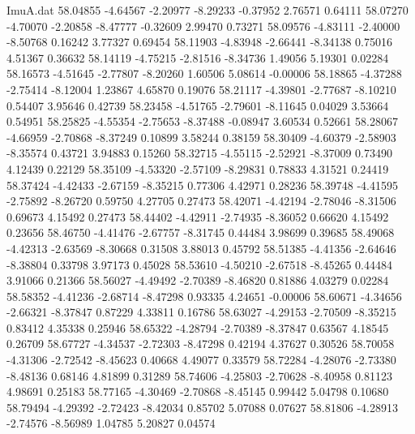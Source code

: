 \begin{filecontents}{ImuA.dat}
  58.04855   -4.64567   -2.20977   -8.29233   -0.37952    2.76571    0.64111
  58.07270   -4.70070   -2.20858   -8.47777   -0.32609    2.99470    0.73271
  58.09576   -4.83111   -2.40000   -8.50768    0.16242    3.77327    0.69454
  58.11903   -4.83948   -2.66441   -8.34138    0.75016    4.51367    0.36632
  58.14119   -4.75215   -2.81516   -8.34736    1.49056    5.19301    0.02284
  58.16573   -4.51645   -2.77807   -8.20260    1.60506    5.08614   -0.00006
  58.18865   -4.37288   -2.75414   -8.12004    1.23867    4.65870    0.19076
  58.21117   -4.39801   -2.77687   -8.10210    0.54407    3.95646    0.42739
  58.23458   -4.51765   -2.79601   -8.11645    0.04029    3.53664    0.54951
  58.25825   -4.55354   -2.75653   -8.37488   -0.08947    3.60534    0.52661
  58.28067   -4.66959   -2.70868   -8.37249    0.10899    3.58244    0.38159
  58.30409   -4.60379   -2.58903   -8.35574    0.43721    3.94883    0.15260
  58.32715   -4.55115   -2.52921   -8.37009    0.73490    4.12439    0.22129
  58.35109   -4.53320   -2.57109   -8.29831    0.78833    4.31521    0.24419
  58.37424   -4.42433   -2.67159   -8.35215    0.77306    4.42971    0.28236
  58.39748   -4.41595   -2.75892   -8.26720    0.59750    4.27705    0.27473
  58.42071   -4.42194   -2.78046   -8.31506    0.69673    4.15492    0.27473
  58.44402   -4.42911   -2.74935   -8.36052    0.66620    4.15492    0.23656
  58.46750   -4.41476   -2.67757   -8.31745    0.44484    3.98699    0.39685
  58.49068   -4.42313   -2.63569   -8.30668    0.31508    3.88013    0.45792
  58.51385   -4.41356   -2.64646   -8.38804    0.33798    3.97173    0.45028
  58.53610   -4.50210   -2.67518   -8.45265    0.44484    3.91066    0.21366
  58.56027   -4.49492   -2.70389   -8.46820    0.81886    4.03279    0.02284
  58.58352   -4.41236   -2.68714   -8.47298    0.93335    4.24651   -0.00006
  58.60671   -4.34656   -2.66321   -8.37847    0.87229    4.33811    0.16786
  58.63027   -4.29153   -2.70509   -8.35215    0.83412    4.35338    0.25946
  58.65322   -4.28794   -2.70389   -8.37847    0.63567    4.18545    0.26709
  58.67727   -4.34537   -2.72303   -8.47298    0.42194    4.37627    0.30526
  58.70058   -4.31306   -2.72542   -8.45623    0.40668    4.49077    0.33579
  58.72284   -4.28076   -2.73380   -8.48136    0.68146    4.81899    0.31289
  58.74606   -4.25803   -2.70628   -8.40958    0.81123    4.98691    0.25183
  58.77165   -4.30469   -2.70868   -8.45145    0.99442    5.04798    0.10680
  58.79494   -4.29392   -2.72423   -8.42034    0.85702    5.07088    0.07627
  58.81806   -4.28913   -2.74576   -8.56989    1.04785    5.20827    0.04574

\end{filecontents}
